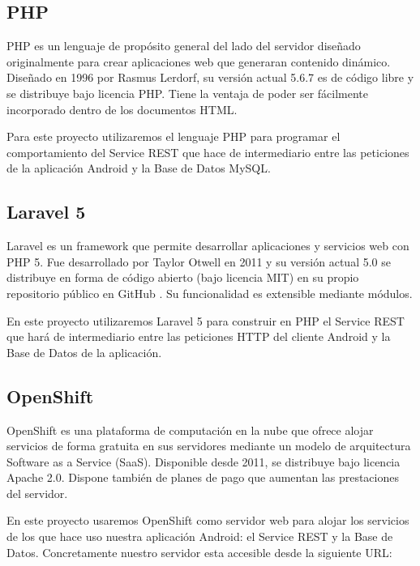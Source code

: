     \subsection{PHP}\label{ssec:php}
    
	PHP \cite{ref:php} es un lenguaje de propósito general del lado del servidor diseñado originalmente para crear aplicaciones web que generaran contenido dinámico. Diseñado en 1996 por Rasmus Lerdorf, su versión actual 5.6.7 es de código libre y se distribuye bajo licencia PHP. Tiene la ventaja de poder ser fácilmente incorporado dentro de los documentos HTML.
	
	Para este proyecto utilizaremos el lenguaje PHP para programar el comportamiento del Service REST que hace de intermediario entre las peticiones de la aplicación Android y la Base de Datos MySQL.
    
    \subsection{Laravel 5}\label{ssec:laravel}
    
	Laravel \cite{ref:laravel} es un framework que permite desarrollar aplicaciones y servicios web con PHP 5. Fue desarrollado por Taylor Otwell en 2011 y su versión actual 5.0 se distribuye en forma de código abierto (bajo licencia MIT) en su propio repositorio público en GitHub \cite{ref:laravel_github}. Su funcionalidad es extensible mediante módulos.
	
	En este proyecto utilizaremos Laravel 5 para construir en PHP el Service REST que hará de intermediario entre las peticiones HTTP del cliente Android y la Base de Datos de la aplicación.
    
    \subsection{OpenShift}\label{ssec:openshift}
    
	OpenShift \cite{ref:OpenShift} es una plataforma de computación en la nube que ofrece alojar servicios de forma gratuita en sus servidores mediante un modelo de arquitectura Software as a Service (SaaS). Disponible desde 2011, se distribuye bajo licencia Apache 2.0. Dispone también de planes de pago que aumentan las prestaciones del servidor.
	
	En este proyecto usaremos OpenShift como servidor web para alojar los servicios de los que hace uso nuestra aplicación Android: el Service REST y la Base de Datos. Concretamente nuestro servidor esta accesible desde la siguiente URL:
	
